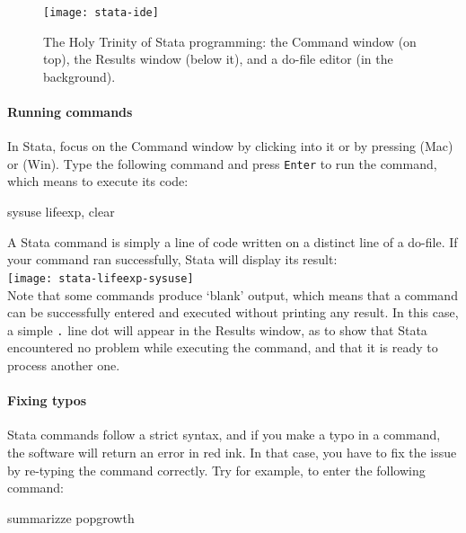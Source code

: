 \begin{figure}
  \texttt{[image: stata-ide]}%
  \caption{The Holy Trinity of Stata programming: the Command window (on top), the Results window (below it), and a do-file editor (in the background).}%
  \label{fig:stata-ide}%
\end{figure}

  \paragraph{Running commands}
  
  In Stata, focus on the Command window by clicking into it or by pressing  (Mac) or (Win). Type the following command and press \texttt{Enter} to run the command, which means to execute its code:%
    
  \begin{docspec}%
    \label{lifeexp}%
    sysuse lifeexp, clear
  \end{docspec}
    
  A Stata command is simply a line of code written on a distinct line of a do-file. If your command ran successfully, Stata will display its result:\\[1em]
    
    \texttt{[image: stata-lifeexp-sysuse]}\\[1em]

  Note that some commands produce `blank' output, which means that a command can be successfully entered and executed without printing any result. In this case, a simple \texttt{.} line dot will appear in the Results window, as to show that Stata encountered no problem while executing the command, and that it is ready to process another one.%

  \paragraph{Fixing typos}%

  Stata commands follow a strict syntax, and if you make a typo in a command, the software will return an error in red ink. In that case, you have to fix the issue by re-typing the command correctly. Try for example, to enter the following command:%
    
    \begin{docspec}
      summarizze popgrowth
    \end{docspec}%
    
